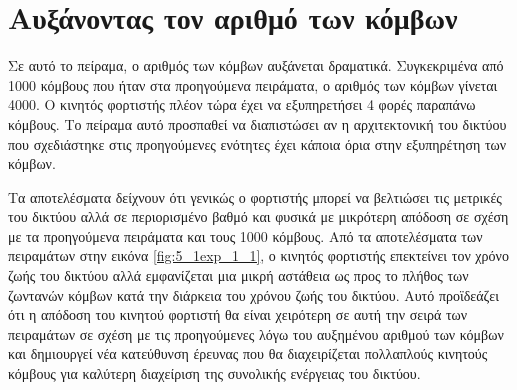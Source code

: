 



















\section{Αυξάνοντας τον αριθμό των κόμβων}\label{sc:result6}
Σε αυτό το πείραμα, ο αριθμός των κόμβων αυξάνεται δραματικά. Συγκεκριμένα από 1000 κόμβους που ήταν στα προηγούμενα πειράματα, ο αριθμός των κόμβων γίνεται 4000. Ο
κινητός φορτιστής πλέον τώρα έχει να εξυπηρετήσει 4 φορές παραπάνω κόμβους. Το πείραμα αυτό προσπαθεί να διαπιστώσει αν η αρχιτεκτονική του δικτύου που σχεδιάστηκε
στις προηγούμενες ενότητες έχει κάποια όρια στην εξυπηρέτηση των κόμβων.

Τα αποτελέσματα δείχνουν ότι γενικώς ο φορτιστής μπορεί να βελτιώσει τις μετρικές του δικτύου αλλά σε περιορισμένο βαθμό και φυσικά με μικρότερη απόδοση σε σχέση με
τα προηγούμενα πειράματα και τους 1000 κόμβους. Από τα αποτελέσματα των πειραμάτων στην εικόνα \ref{fig:5_1exp_1_1}, ο κινητός φορτιστής επεκτείνει τον χρόνο ζωής του
δικτύου αλλά εμφανίζεται μια μικρή αστάθεια ως προς το πλήθος των ζωντανών κόμβων κατά την διάρκεια του χρόνου ζωής του δικτύου. Αυτό προϊδεάζει ότι η απόδοση του
κινητού φορτιστή θα είναι χειρότερη σε αυτή την σειρά των πειραμάτων σε σχέση με τις προηγούμενες λόγω του αυξημένου αριθμού των κόμβων και δημιουργεί νέα κατεύθυνση
έρευνας που θα διαχειρίζεται πολλαπλούς κινητούς κόμβους για καλύτερη διαχείριση της συνολικής ενέργειας του δικτύου.

